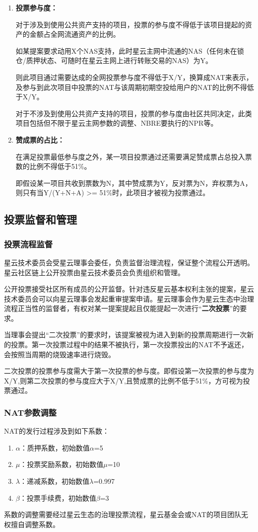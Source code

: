 \begin{enumerate}
	\item 

	\textbf{投票参与度：}

	对于涉及到使用公共资产支持的项目，投票的参与度不得低于该项目提起的资产的金额占全网流通资产的比例。

	如某提案要求动用X个NAS支持，此时星云主网中流通的NAS（任何未在锁仓/质押状态、可随时在星云主网上进行转账交易的NAS）为Y。

	则此项目通过需要达成的全网投票参与度不得低于X/Y，换算成NAT来表示，及参与到此次项目中投票的NAT与该周期初期空投给用户的NAT的比例不得低于X/Y。

	对于不涉及到使用公共资产支持的项目，投票的参与度由社区共同决定，此类项目包括但不限于星云主网参数的调整、NBRE要执行的NPR等。

	\item

	\textbf{赞成票的占比：}

	在满足投票最低参与度之外，某一项目投票通过还需要满足赞成票占总投入票数的比例不得低于51\%。

	即假设某一项目共收到票数为N，其中赞成票为Y，反对票为N，弃权票为A，则只有当Y/(Y+N+A) >= 51\%时，此项目才被视为投票通过。
\end{enumerate}

\subsection{投票监督和管理}

\subsubsection{投票流程监督}
\label{second-vote}

星云技术委员会受星云理事会委任，负责监督治理流程，保证整个流程公开透明。星云社区链上公开投票由星云技术委员会负责组织和管理。

公开投票接受社区所有成员的公开监督。针对违反星云基本权利主张的提案，星云技术委员会可以向星云理事会发起重审提案申请。星云理事会作为星云生态中治理流程正当性的监督者，有权对某一提案提起且仅能提起一次进行“\textbf{二次投票}”的要求。

当理事会提出“二次投票”的要求时，该提案被视为进入到新的投票周期进行一次新的投票。第一次投票过程中的结果不被执行，第一次投票投出的NAT不予返还，会按照当周期的烧毁速率进行烧毁。

二次投票的投票参与度需大于第一次投票的参与度。即假设第一次投票的参与度为X/Y,则第二次投票的参与度应大于X/Y,且赞成票的比例不低于51\%，方可视为投票通过。

\subsubsection{NAT参数调整}

NAT的发行过程涉及到如下系数：

\begin{enumerate}
	\item $\alpha$：质押系数，初始数值$\alpha$=5
	\item $\mu$：投票奖励系数，初始数值$\mu$=10
	\item $\lambda$：递减系数，初始数值$\lambda$=0.997
	\item $\beta$：投票手续费，初始数值$\beta$=3
\end{enumerate}

系数的调整需要经过星云生态的治理投票流程，星云基金会或NAT的项目团队无权擅自调整系数。




